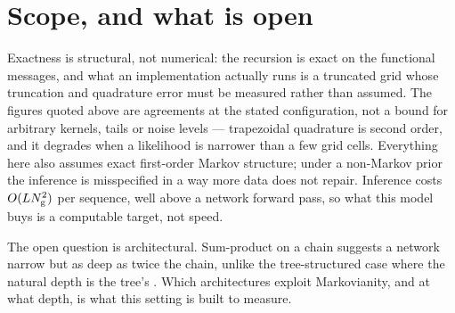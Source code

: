 \documentclass{article}
\theoremstyle{definition}
\theoremstyle{plain}
\begin{document}
\section{Scope, and what is open}

Exactness is structural, not numerical: the recursion is exact on the functional messages, and what
an implementation actually runs is a truncated grid whose truncation and quadrature error must be
measured rather than assumed. The figures quoted above are agreements at the stated configuration,
not a bound for arbitrary kernels, tails or noise levels --- trapezoidal quadrature is second order,
and it degrades when a likelihood is narrower than a few grid cells. Everything here also assumes
exact first-order Markov structure; under a non-Markov prior the inference is misspecified in a way
more data does not repair. Inference costs $O(LN_{\mathrm{g}}^{2})$ per sequence, well above a network
forward pass, so what this model buys is a computable target, not speed.

The open question is architectural. Sum-product on a chain suggests a network narrow but as deep
as twice the chain, unlike the tree-structured case where the natural depth is the tree's
\citep{mei2024unets,garnierbrun2024transformers}. Which architectures exploit Markovianity, and at
what depth, is what this setting is built to measure.

\label{LastMainPage}



\clearpage
\appendix

\end{document}
